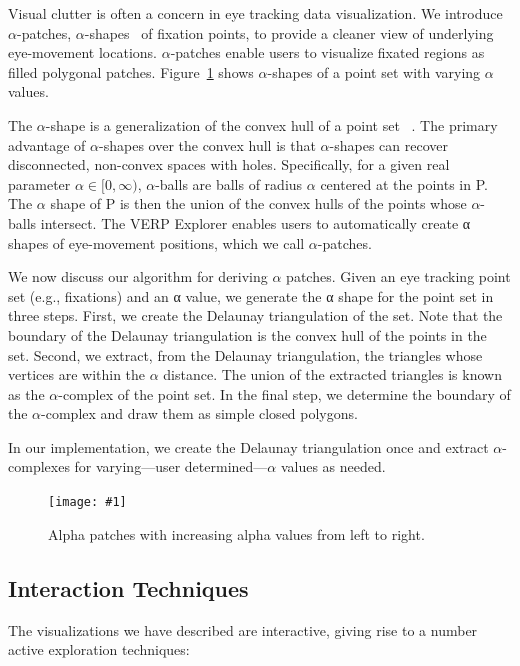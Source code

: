 \documentclass[journal]{vgtc}                %
\newcommand{\insertpicture}[2]{\begin{center}\texttt{[image: \#1]}\end{center}}
\begin{document}
Visual clutter is often a concern in eye tracking data visualization.  We
introduce $\alpha$-patches, $\alpha$-shapes~\cite{Edelsbrunner_1994} of 
fixation points, to provide a cleaner view of underlying eye-movement 
locations. $\alpha$-patches enable users to visualize fixated regions 
as filled polygonal patches. Figure~\ref{fig:alphapatch} shows $\alpha$-shapes 
of a point set with  varying $\alpha$ values.

The $\alpha$-shape is a generalization of the convex hull of a point set
~\cite{Edelsbrunner_1994}. The primary advantage of $\alpha$-shapes over 
the convex hull is that $\alpha$-shapes can recover disconnected, non-convex 
spaces with holes. Specifically, for a given real parameter $\alpha \in [0,\infty)$, 
$\alpha$-balls are balls of radius $\alpha$ centered at the points in P.
The $\alpha$ shape of P is then the union of the convex hulls of the
points whose $\alpha$-balls intersect. The VERP Explorer enables users
to automatically create α shapes of eye-movement positions, which we call
$\alpha$-patches.  

We now discuss our algorithm for deriving $\alpha$ patches. Given an eye
tracking point set (e.g., fixations) and an α value, we generate the α
shape for the point set in three steps. First, we create the Delaunay
triangulation of the set.  Note that the boundary of the Delaunay
triangulation is the convex hull of the points in the set. Second, we
extract, from the Delaunay triangulation, the triangles whose vertices
are within the $\alpha$  distance.   The union of the extracted triangles
is known as the $\alpha$-complex of the point set. In the final step, we
determine the boundary of the $\alpha$-complex and draw them as simple
closed polygons. 
	
In our implementation, we create the Delaunay triangulation once and
extract $\alpha$-complexes for varying---user determined---$\alpha$
values as needed.

	\begin{figure}

		\insertpicture{figures/alphapatch.pdf}{0.5}
		\caption{Alpha patches with increasing alpha values from left to
			right. \label{fig:alphapatch}}

	\end{figure}


\subsection{Interaction Techniques} 
The visualizations we have described are interactive, giving rise 
to a number active exploration techniques: 
\end{document}

